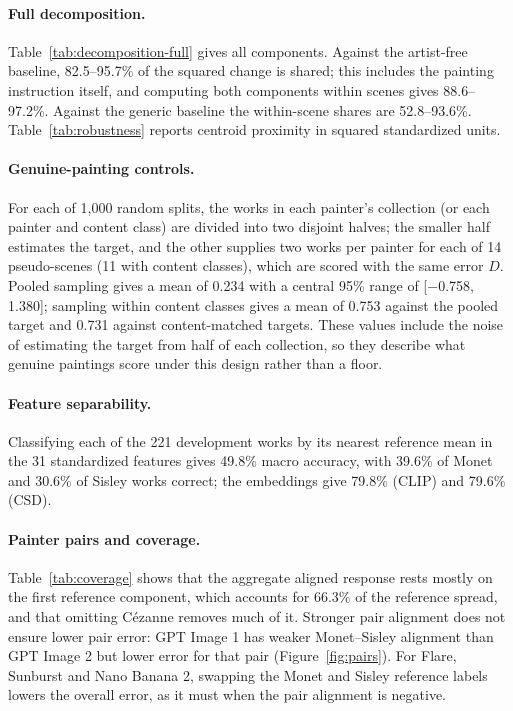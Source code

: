 \paragraph{Full decomposition.} Table~\ref{tab:decomposition-full} gives all components. Against
the artist-free baseline, 82.5--95.7\% of the squared change is shared; this includes the
painting instruction itself, and computing both components within scenes gives 88.6--97.2\%.
Against the generic baseline the within-scene shares are 52.8--93.6\%. Table~\ref{tab:robustness}
reports centroid proximity in squared standardized units.

\paragraph{Genuine-painting controls.} For each of 1,000 random splits, the works in each
painter's collection (or each painter and content class) are divided into two disjoint halves;
the smaller half estimates the target, and the other supplies two works per painter for each of
14 pseudo-scenes (11 with content classes), which are scored with the same error $D$. Pooled
sampling gives a mean of 0.234 with a central 95\% range of [$-$0.758, 1.380]; sampling within
content classes gives a mean of 0.753 against the pooled target and 0.731 against content-matched
targets. These values include the noise of estimating the target from half of each collection, so
they describe what genuine paintings score under this design rather than a floor.

\paragraph{Feature separability.} Classifying each of the 221 development works by its nearest
reference mean in the 31 standardized features gives 49.8\% macro accuracy, with 39.6\% of Monet
and 30.6\% of Sisley works correct; the embeddings give 79.8\% (CLIP) and 79.6\% (CSD).

\paragraph{Painter pairs and coverage.} Table~\ref{tab:coverage} shows that the aggregate
aligned response rests mostly on the first reference component, which accounts for 66.3\% of
the reference spread, and that omitting C\'ezanne removes much of it. Stronger pair alignment
does not ensure lower pair error: GPT Image 1 has weaker Monet--Sisley alignment than GPT Image
2 but lower error for that pair (Figure~\ref{fig:pairs}). For Flare, Sunburst and Nano Banana
2, swapping the Monet and Sisley reference labels lowers the overall error, as it must when the
pair alignment is negative.

